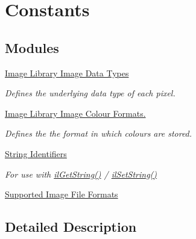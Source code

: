 \hypertarget{group__il__consts}{\section{Constants}
\label{group__il__consts}
}
\subsection*{Modules}
\begin{DoxyCompactItemize}
\item 
\hyperlink{group__il__data__types}{Image Library Image Data Types}
\begin{DoxyCompactList}\small\item\em Defines the underlying data type of each pixel. \end{DoxyCompactList}\item 
\hyperlink{group__il__data__formats}{Image Library Image Colour Formats.}
\begin{DoxyCompactList}\small\item\em Defines the the format in which colours are stored. \end{DoxyCompactList}\item 
\hyperlink{group__il__strings}{String Identifiers}
\begin{DoxyCompactList}\small\item\em For use with \hyperlink{group__state_ga29fd50e44b7e69435d64f82613438e4f}{il\+Get\+String()} / \hyperlink{group__state_ga9a4eb898282d4a5cdecc6303bca20814}{il\+Set\+String()} \end{DoxyCompactList}\item 
\hyperlink{group__il__formats}{Supported Image File Formats}
\end{DoxyCompactItemize}


\subsection{Detailed Description}
